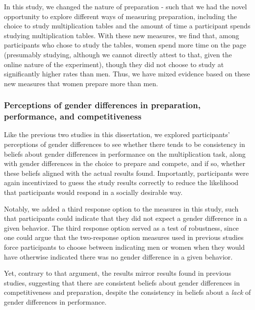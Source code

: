 \documentclass[letterpaper, nobind]{templates/ociamthesis}
\begin{document}
In this study, we changed the nature of preparation - such that we had the novel opportunity to explore different ways of measuring preparation, including the choice to study multiplication tables and the amount of time a participant spends studying multiplication tables. With these new measures, we find that, among participants who chose to study the tables, women spend more time on the page (presumably studying, although we cannot directly attest to that, given the online nature of the experiment), though they did not choose to study at significantly higher rates than men. Thus, we have mixed evidence based on these new measures that women prepare more than men.

\hypertarget{perceptions-of-gender-differences-in-preparation-performance-and-competitiveness-4}{%
\subsubsection{Perceptions of gender differences in preparation, performance, and competitiveness}\label{perceptions-of-gender-differences-in-preparation-performance-and-competitiveness-4}}

Like the previous two studies in this dissertation, we explored participants' perceptions of gender differences to see whether there tends to be consistency in beliefs about gender differences in performance on the multiplication task, along with gender differences in the choice to prepare and compete, and if so, whether these beliefs aligned with the actual results found. Importantly, participants were again incentivized to guess the study results correctly to reduce the likelihood that participants would respond in a socially desirable way.

Notably, we added a third response option to the measures in this study, such that participants could indicate that they did not expect a gender difference in a given behavior. The third response option served as a test of robustness, since one could argue that the two-response option measures used in previous studies force participants to choose between indicating men or women when they would have otherwise indicated there was no gender difference in a given behavior.

Yet, contrary to that argument, the results mirror results found in previous studies, suggesting that there are consistent beliefs about gender differences in competitiveness and preparation, despite the consistency in beliefs about a \emph{lack} of gender differences in performance.
\end{document}
